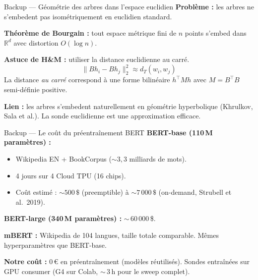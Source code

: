 \documentclass[aspectratio=169,11pt]{beamer}
\begin{document}
\begin{frame}{Backup --- Géométrie des arbres dans l'espace euclidien}
  \textbf{Problème :} les arbres ne s'embedent pas isométriquement
  en euclidien standard.

  \medskip
  \textbf{Théorème de Bourgain :} tout espace métrique fini de $n$
  points s'embed dans $\mathbb{R}^d$ avec distortion $O(\log n)$.

  \medskip
  \textbf{Astuce de H\&M :} utiliser la \alert{distance euclidienne au carré}.
  \[
    \|B h_i - B h_j\|_2^2 \approx d_T(w_i, w_j)
  \]
  La distance \emph{au carré} correspond à une forme bilinéaire
  $h^\top M h$ avec $M = B^\top B$ semi-définie positive.

  \medskip
  \textbf{Lien :} les arbres s'embedent naturellement en géométrie
  hyperbolique (Khrulkov, Sala et al.). La sonde euclidienne est
  une approximation efficace.
\end{frame}

\begin{frame}{Backup --- Le coût du préentraînement BERT}
  \textbf{BERT-base (110\,M paramètres) :}
  \begin{itemize}\setlength\itemsep{2pt}
    \item Wikipedia EN + BookCorpus ($\sim 3{,}3$ milliards de mots).
    \item 4 jours sur 4 Cloud TPU (16 chips).
    \item Coût estimé : $\sim 500\,\$$ (preemptible) à $\sim 7\,000\,\$$ (on-demand, Strubell et al.\ 2019).
  \end{itemize}

  \medskip
  \textbf{BERT-large (340\,M paramètres) :} $\sim$\,60\,000\,\$.

  \medskip
  \textbf{mBERT :} Wikipedia de 104 langues, taille totale comparable.
  Mêmes hyperparamètres que BERT-base.

  \vspace{0.4cm}
  \textbf{Notre coût :} 0\,\euro{} en préentraînement (modèles
  réutilisés). Sondes entraînées sur GPU consumer (G4 sur Colab,
  $\sim$\,3\,h pour le sweep complet).
\end{frame}
\end{document}
